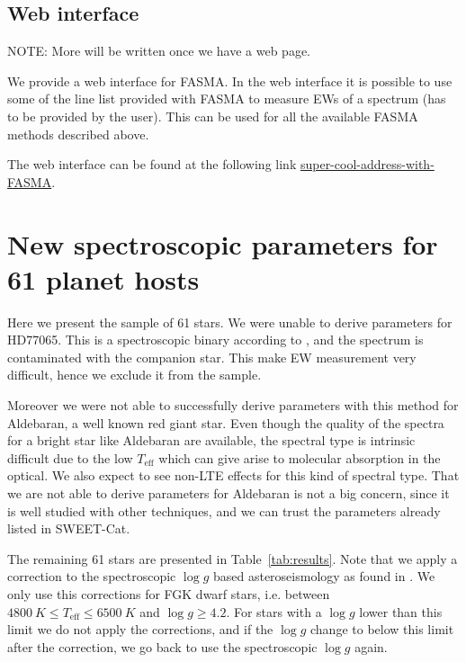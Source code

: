 \documentclass{aa}
\begin{document}
\subsection{Web interface}
\label{sub:Web interface}
NOTE: More will be written once we have a web page.

We provide a web interface for FASMA. In the web interface it is possible to use
some of the line list provided with FASMA to measure EWs of a spectrum (has to
be provided by the user). This can be used for all the available FASMA methods
described above.

The web interface can be found at the following link
\url{super-cool-address-with-FASMA}.



\section{New spectroscopic parameters for 61 planet hosts}
\label{sec:results}
Here we present the sample of 61 stars. We were unable to derive parameters for
HD77065. This is a spectroscopic binary according to \cite{Pourbaix2004}, and
the spectrum is contaminated with the companion star. This make EW measurement
very difficult, hence we exclude it from the sample.

Moreover we were not able to successfully derive parameters with this method for
Aldebaran, a well known red giant star. Even though the quality of the spectra
for a bright star like Aldebaran are available, the spectral type is intrinsic
difficult due to the low $T_\mathrm{eff}$ which can give arise to molecular
absorption in the optical. We also expect to see non-LTE effects for this kind
of spectral type. That we are not able to derive parameters for Aldebaran is not
a big concern, since it is well studied with other techniques, and we can trust
the parameters already listed in SWEET-Cat.

The remaining 61 stars are presented in Table~\ref{tab:results}. Note that we
apply a correction to the spectroscopic $\log g$ based asteroseismology as
found in \citet{Mortier2014}. We only use this corrections for FGK dwarf stars,
i.e. between $\SI{4800}{K}\leq T_\mathrm{eff} \leq \SI{6500}{K}$ and
$\log g\geq4.2$. For stars with a $\log g$ lower than this limit we do not apply
the corrections, and if the $\log g$ change to below this limit after the
correction, we go back to use the spectroscopic $\log g$ again.
\end{document}
